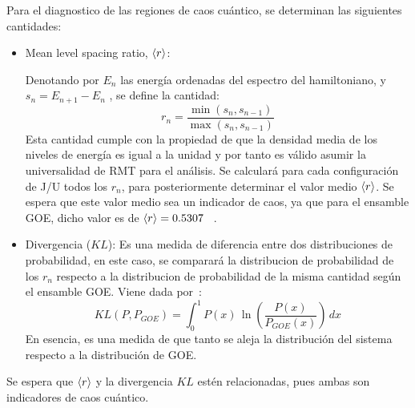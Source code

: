\documentclass[spanish,titlepage,table]{practicas}
\begin{document}
Para el diagnostico de las regiones de caos cuántico, se determinan las siguientes cantidades:
\begin{itemize}
    \item Mean level spacing ratio, $\ev{r}$:

Denotando por $E_n$ las energía ordenadas del espectro del hamiltoniano, y
    $s_n=E_{n+1}-E_{n}$ , se define la cantidad:
		\begin{equation}
			r_n=\frac{\min(s_n,s_{n-1})}{\max(s_n,s_{n-1})}
		\end{equation}
    Esta cantidad cumple con la propiedad de que la densidad media de los niveles de energía es igual a la unidad
    y por tanto es válido asumir la universalidad de RMT para el análisis.
    Se calculará para cada configuración de J/U\janote{\$\$} todos los $r_n$, para posteriormente determinar el valor medio $\ev{r}$.
    Se espera que este valor medio sea un indicador de caos, ya que para el ensamble GOE, dicho valor es de $\ev{r}=0.5307$~\cite{Atas_2013} .
    \item Divergencia ($KL$): Es una medida de diferencia entre dos distribuciones de probabilidad, en este caso, se comparará la distribucion de probabilidad de los $r_n$ 
    respecto a la distribucion de probabilidad de la misma cantidad según el ensamble GOE. Viene dada por~\cite{Pausch2022}:
    \begin{equation}
KL(P,P_{GOE}) = \int_{0}^{1} P(x) \, \ln \left( \frac{P(x)}{P_{GOE}(x)} \right) \, dx
    \end{equation}
    En esencia, es una medida de que tanto se aleja la distribución del sistema respecto a la distribución de GOE.   
\end{itemize}
Se espera que $\ev{r}$ y la divergencia $KL$ estén relacionadas, pues ambas son indicadores de caos cuántico. 
\end{document}
